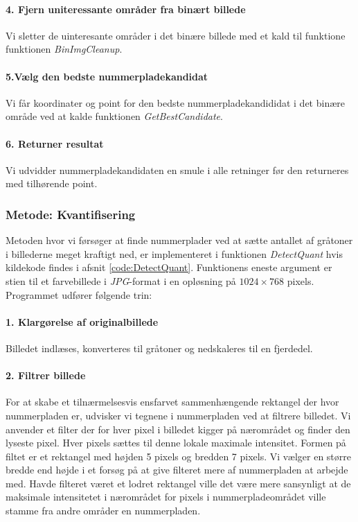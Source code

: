 \paragraph{4. Fjern uniteressante områder fra binært billede}
Vi sletter de uinteresante områder i det binære billede med et kald til funktione funktionen \textit{BinImgCleanup}.

\paragraph{5.Vælg den bedste nummerpladekandidat}
Vi får koordinater og point for den bedste nummerpladekandididat i det binære område ved at kalde funktionen \textit{GetBestCandidate}. 

\paragraph{6. Returner resultat}
Vi udvidder nummerpladekandidaten en smule i alle retninger før den returneres med tilhørende point.

\subsubsection{Metode: Kvantifisering}
Metoden hvor vi førsøger at finde nummerplader ved at sætte antallet af gråtoner i billederne meget kraftigt ned, er implementeret i funktionen \textit{DetectQuant} hvis kildekode findes i afsnit \vref{code:DetectQuant}. Funktionens eneste argument er stien til et farvebillede i \textit{JPG}-format i en opløsning på $1024 \times 768$ pixels. Programmet udfører følgende trin:


\paragraph{1. Klargørelse af originalbillede}
Billedet indlæses, konverteres til gråtoner og nedskaleres til en fjerdedel. 

\paragraph{2. Filtrer billede}
For at skabe et tilnærmelsesvis ensfarvet sammenhængende rektangel der hvor nummerpladen er, udvisker vi tegnene i nummerpladen ved at filtrere billedet. Vi anvender et filter der for hver pixel i billedet kigger på nærområdet og finder den lyseste pixel. Hver pixels sættes til denne lokale maximale intensitet. Formen på filtet er et rektangel med højden 5 pixels og bredden 7 pixels. Vi vælger en større bredde end højde i et forsøg på at give filteret mere af  nummerpladen at arbejde med. Havde filteret været et lodret rektangel ville det være mere sansynligt at de maksimale intensitetet i nærområdet for pixels i nummerpladeområdet ville stamme fra andre områder en nummerpladen.

